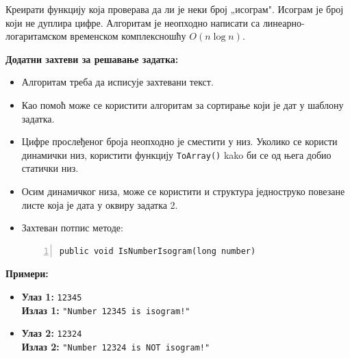 Креирати функцију која проверава да ли је неки број „исограм". Исограм је број који не дуплира цифре. Алгоритам је неопходно написати са линеарно-логаритамском временском комплексношћу $O(n \log n)$.

\textbf{Додатни захтеви за решавање задатка:}
\begin{itemize}
    \item Алгоритам треба да исписује захтевани текст.
    \item Као помоћ може се користити алгоритам за сортирање који је дат у шаблону задатка.
    \item Цифре прослеђеног броја неопходно је сместити у низ. Уколико се користи динамички низ, користити функцију \texttt{ToArray()} kako би се од њега добио статички низ.
    \item Осим динамичког низа, може се користити и структура једноструко повезане листе која је дата у оквиру задатка 2.
    \item Захтеван потпис методе:
    \begin{Verbatim}[fontsize=\footnotesize, numbers=left, xleftmargin=10mm]
public void IsNumberIsogram(long number)
    \end{Verbatim}
\end{itemize}

\textbf{Примери:}
\begin{itemize}
    \item \textbf{Улаз 1:} \texttt{12345} \\
          \textbf{Излаз 1:} \texttt{"Number 12345 is isogram!"}
    \item \textbf{Улаз 2:} \texttt{12324} \\
          \textbf{Излаз 2:} \texttt{"Number 12324 is NOT isogram!"}
\end{itemize}

